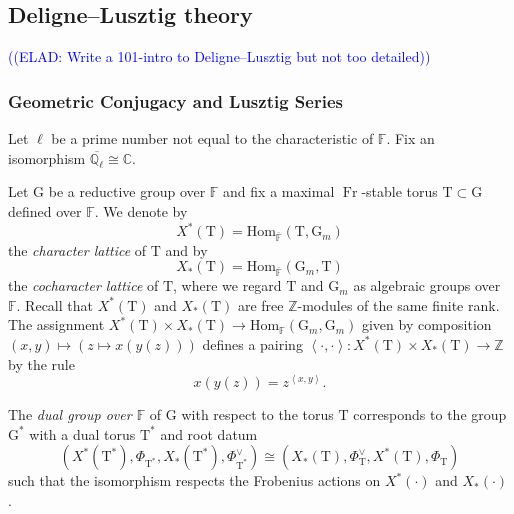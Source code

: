 \documentclass[12pt, reqno]{amsart}
\theoremstyle{definition}
\theoremstyle{definition}
\theoremstyle{definition}
\newcommand{\zIntegers}{\mathbb{Z}}
\newcommand{\cComplex}{\mathbb{C}}
\newcommand{\Hom}{\mathrm{Hom}}
\newcommand{\innerproduct}[2]{\left\langle #1,#2\right\rangle}
\newcommand{\finiteField}{\mathbb{F}}
\newcommand{\algebraicClosure}[1]{\overline{#1}}
\newcommand{\Frobenius}{\operatorname{Fr}}
\newcommand{\multiplcativeScheme}{\algebraicGroup{G}_m}
\newcommand{\ladicnumbers}{\algebraicClosure{\mathbb{Q}_{\ell}}}
\newcommand{\algebraicGroup}[1]{\boldsymbol{\mathrm{#1}}}
\newcommand{\CharacterLattice}[1]{X^{\ast}\left(#1\right)}
\newcommand{\CocharacterLattice}[1]{X_{\ast}\left(#1\right)}
\newcommand{\elad}[1]{\textcolor{blue}{\sffamily ((ELAD: #1))}}
\begin{document}
\subsection{Deligne--Lusztig theory}
\elad{Write a 101-intro to Deligne--Lusztig but not too detailed}



\subsubsection{Geometric Conjugacy and Lusztig Series}
Let $\ell$ be a prime number not equal to the characteristic of $\finiteField$. Fix an isomorphism $\ladicnumbers \cong \cComplex$.

Let $\algebraicGroup{G}$ be a reductive group over $\finiteField$ and fix a maximal $\Frobenius$-stable torus $\algebraicGroup{T} \subset \algebraicGroup{G}$ defined over $\finiteField$. We denote by $$\CharacterLattice{\algebraicGroup{T}} = \Hom_{\algebraicClosure{\finiteField}}\left(\algebraicGroup{T}, \multiplcativeScheme\right)$$ the \emph{character lattice} of $\algebraicGroup{T}$ and by $$\CocharacterLattice{\algebraicGroup{T}} = \Hom_{\algebraicClosure{\finiteField}}\left(\multiplcativeScheme, \algebraicGroup{T}\right)$$ the \emph{cocharacter lattice} of $\algebraicGroup{T}$, where we regard $\algebraicGroup{T}$ and $\multiplcativeScheme$ as algebraic groups over $\finiteField$. Recall that $\CharacterLattice{\algebraicGroup{T}}$ and $\CocharacterLattice{\algebraicGroup{T}}$ are free $\zIntegers$-modules of the same finite rank. The assignment $\CharacterLattice{\algebraicGroup{T}} \times \CocharacterLattice{\algebraicGroup{T}} \to \Hom_{\finiteField}\left(\multiplcativeScheme, \multiplcativeScheme\right)$ given by composition $\left(x,y\right) \mapsto \left(z \mapsto x\left(y\left(z\right)\right)\right)$ defines a pairing $\innerproduct{\cdot}{\cdot} \colon \CharacterLattice{\algebraicGroup{T}} \times \CocharacterLattice{\algebraicGroup{T}} \to \zIntegers$ by the rule $$x\left(y\left(z\right)\right) = z^{\innerproduct{x}{y}}.$$

The \emph{dual group over $\finiteField$} of $\algebraicGroup{G}$ with respect to the torus $\algebraicGroup{T}$ corresponds to the group $\algebraicGroup{G}^*$ with a dual torus $\algebraicGroup{T}^*$ and root datum
\[
(\CharacterLattice{\algebraicGroup{T}^*},\Phi_{\algebraicGroup{T}^*},\CocharacterLattice{\algebraicGroup{T}^*},\Phi_{\algebraicGroup{T}^*}^\vee) \cong (\CocharacterLattice{\algebraicGroup{T}},\Phi_{\algebraicGroup{T}}^\vee,\CharacterLattice{\algebraicGroup{T}},\Phi_{\algebraicGroup{T}})
\]
such that the isomorphism respects the Frobenius actions on $\CharacterLattice{\cdot}$ and $\CocharacterLattice{\cdot}$.
\end{document}
